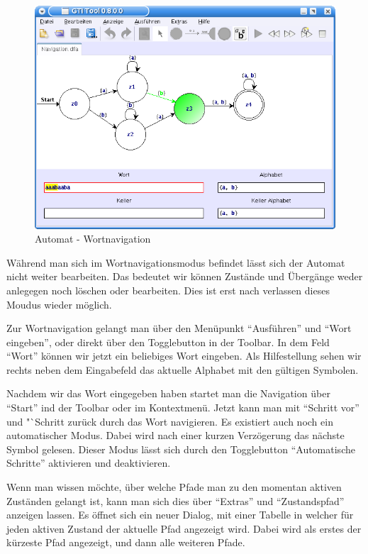     
\begin{figure}[h]
\begin{center}
\includegraphics[width=12cm]{images/dfa_navigation.png}
\caption{Automat - Wortnavigation}
\end{center}
\end{figure}
  
  Während man sich im Wortnavigationsmodus befindet lässt sich der Automat nicht
  weiter bearbeiten. Das bedeutet wir können Zustände und Übergänge weder
  anlegegen noch löschen oder bearbeiten. Dies ist erst nach verlassen dieses
  Moudus wieder möglich.\vspace{10pt}
  
  Zur Wortnavigation gelangt man über den Menüpunkt "`Ausführen"' und "`Wort
  eingeben"', oder direkt über den Togglebutton in der Toolbar. In dem Feld
  "`Wort"' können wir jetzt ein beliebiges Wort eingeben. Als Hilfestellung sehen
  wir rechts neben dem Eingabefeld das aktuelle Alphabet mit den gültigen
  Symbolen.\vspace{10pt}
  
  Nachdem wir das Wort eingegeben haben startet man die Navigation über "`Start"'
  ind der Toolbar oder im Kontextmenü. Jetzt kann man mit "`Schritt vor"' und
  "`Schritt zurück durch das Wort navigieren. Es existiert auch noch ein
  automatischer Modus. Dabei wird nach einer kurzen Verzögerung das nächste
  Symbol gelesen. Dieser Modus lässt sich durch den Togglebutton "`Automatische
  Schritte"' aktivieren und deaktivieren.\vspace{10pt}

  Wenn man wissen möchte, über welche Pfade man zu den momentan aktiven Zuständen
  gelangt ist, kann man sich dies über "`Extras"' und "`Zustandspfad"' anzeigen
  lassen. Es öffnet sich ein neuer Dialog, mit einer Tabelle in welcher für jeden
  aktiven Zustand der aktuelle Pfad angezeigt wird. Dabei wird als erstes der
  kürzeste Pfad angezeigt, und dann alle weiteren Pfade.\vspace{10pt}
  
